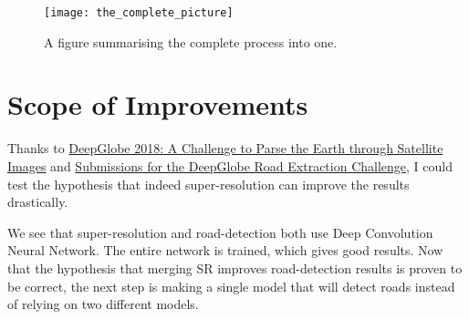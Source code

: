 \begin{sidewaysfigure}
  \centering
  \texttt{[image: the\_complete\_picture]}
  \caption{A figure summarising the complete process into one.}
  \label{fig:the_complete_picture}
\end{sidewaysfigure}

\chapter{Scope of Improvements}

Thanks to \href{https://arxiv.org/pdf/1805.06561.pdf}{DeepGlobe 2018: A Challenge to Parse the Earth through Satellite Images} and \href{http://openaccess.thecvf.com/content_cvpr_2018_workshops/papers/w4/Zhou_D-LinkNet_LinkNet_With_CVPR_2018_paper.pdf}{Submissions for the DeepGlobe Road Extraction Challenge}, I could test the hypothesis that indeed super-resolution can improve the results drastically.

We see that super-resolution and road-detection both use Deep Convolution Neural Network. The entire network is trained, which gives good results. Now that the hypothesis that merging SR improves road-detection results is proven to be correct, the next step is making a single model that will detect roads instead of relying on two different models.

\pagebreak
